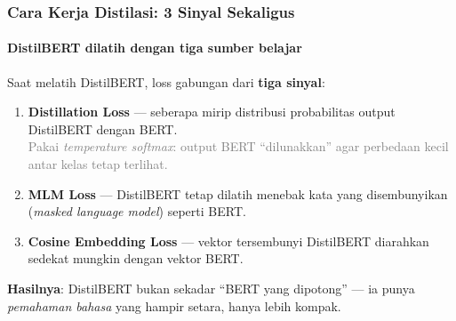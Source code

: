 \documentclass[t,aspectratio=169,xcolor=dvipsnames]{beamer}
\begin{document}
\begin{frame}[shrink=5]
    \frametitle{Cara Kerja Distilasi: 3 Sinyal Sekaligus}
    \framesubtitle{DistilBERT dilatih dengan tiga sumber belajar}
    \small
    Saat melatih DistilBERT, loss gabungan dari \textbf{tiga sinyal}:

    \vspace{0.2em}
    \begin{enumerate}
        \item \textbf{Distillation Loss} --- seberapa mirip distribusi probabilitas output DistilBERT dengan BERT.\\
              \textcolor{gray}{\footnotesize Pakai \textit{temperature softmax}: output BERT ``dilunakkan'' agar perbedaan kecil antar kelas tetap terlihat.}

        \vspace{0.2em}
        \item \textbf{MLM Loss} --- DistilBERT tetap dilatih menebak kata yang disembunyikan (\textit{masked language model}) seperti BERT.

        \vspace{0.2em}
        \item \textbf{Cosine Embedding Loss} --- vektor tersembunyi DistilBERT diarahkan sedekat mungkin dengan vektor BERT.
    \end{enumerate}

    \vspace{0.2em}
    \begin{tcolorbox}[colback=nyublue!8, colframe=nyublue, boxrule=0.7mm, arc=2mm]
        \footnotesize
        \textbf{Hasilnya}: DistilBERT bukan sekadar ``BERT yang dipotong'' --- ia punya \textit{pemahaman bahasa} yang hampir setara, hanya lebih kompak.
    \end{tcolorbox}
\end{frame}
\end{document}
